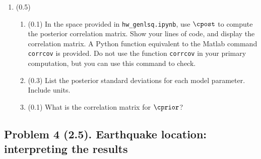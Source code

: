 \documentclass[11pt,titlepage,fleqn]{article}
\newcommand{\tfile}{{\tt hw\_genlsq.ipynb}}
\begin{document}
\begin{enumerate}

\item (0.5) 
\begin{enumerate}
\item (0.1) In the space provided in \tfile, use $\cpost$ to compute the posterior correlation matrix. Show your lines of code, and display the correlation matrix. A Python function equivalent to the Matlab command \verb+corrcov+ is provided. Do not use the function \verb+corrcov+ in your primary computation, but you can use this command to check.

\item (0.3) List the posterior standard deviations for each model parameter. Include units.

\item (0.1) What is the correlation matrix for $\cprior$?
\end{enumerate}

\end{enumerate}


\subsection*{Problem 4 (2.5). Earthquake location: interpreting the results}
\end{document}

